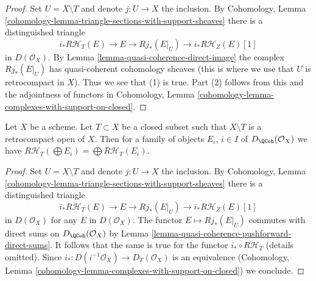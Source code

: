 \begin{proof}
Set $U = X \setminus T$ and denote $j : U \to X$ the inclusion. By
Cohomology, Lemma \ref{cohomology-lemma-triangle-sections-with-support-sheaves}
there is a distinguished triangle
$$
i_*R\mathcal{H}_T(E) \to E \to Rj_*(E|_U) \to i_*R\mathcal{H}_Z(E)[1]
$$
in $D(\mathcal{O}_X)$. By Lemma \ref{lemma-quasi-coherence-direct-image}
the complex $Rj_*(E|_U)$ has quasi-coherent cohomology sheaves
(this is where we use that $U$ is retrocompact in $X$).
Thus we see that (1) is true. Part (2) follows from this and
the adjointness of functors in
Cohomology, Lemma \ref{cohomology-lemma-complexes-with-support-on-closed}.
\end{proof}

\begin{lemma}
\label{lemma-support-direct-sums}
Let $X$ be a scheme. Let $T \subset X$ be a closed subset such that
$X \setminus T$ is a retrocompact open of $X$. Then for a family of
objects $E_i$, $i \in I$ of $D_\QCoh(\mathcal{O}_X)$ we have
$R\mathcal{H}_T(\bigoplus E_i) = \bigoplus R\mathcal{H}_T(E_i)$.
\end{lemma}

\begin{proof}
Set $U = X \setminus T$ and denote $j : U \to X$ the inclusion. By
Cohomology, Lemma \ref{cohomology-lemma-triangle-sections-with-support-sheaves}
there is a distinguished triangle
$$
i_*R\mathcal{H}_T(E) \to E \to Rj_*(E|_U) \to i_*R\mathcal{H}_Z(E)[1]
$$
in $D(\mathcal{O}_X)$ for any $E$ in $D(\mathcal{O}_X)$. The functor
$E \mapsto Rj_*(E|_U)$ commutes with direct sums on $D_\QCoh(\mathcal{O}_X)$
by Lemma \ref{lemma-quasi-coherence-pushforward-direct-sums}.
It follows that the same is true for the functor $i_* \circ R\mathcal{H}_T$
(details omitted). Since $i_* : D(i^{-1}\mathcal{O}_X) \to D_T(\mathcal{O}_X)$
is an equivalence
(Cohomology, Lemma \ref{cohomology-lemma-complexes-with-support-on-closed})
we conclude.
\end{proof}

